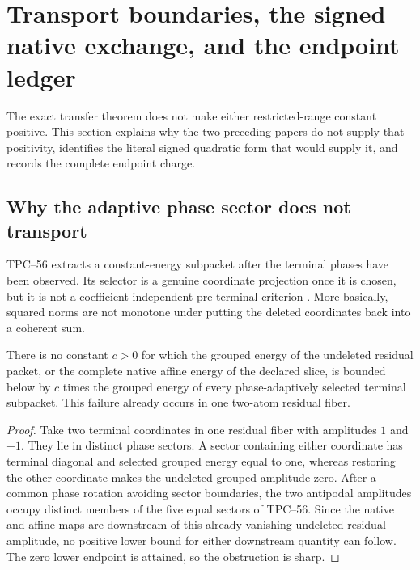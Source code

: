 \section{Transport boundaries, the signed native exchange, and the endpoint ledger}
\label{sec:tpc58-transport-ledger}

The exact transfer theorem does not make either restricted-range constant
positive.  This section explains why the two preceding papers do not supply
that positivity, identifies the literal signed quadratic form that would
supply it, and records the complete endpoint charge.

\subsection{Why the adaptive phase sector does not transport}

TPC--56 extracts a constant-energy subpacket after the terminal phases have
been observed.  Its selector is a genuine coordinate projection once it is
chosen, but it is not a coefficient-independent pre-terminal criterion
\citep{WangTPC56}.  More basically, squared norms are not monotone under
putting the deleted coordinates back into a coherent sum.

\begin{proposition}
\label{prop:tpc58-adaptive-nontransport}
There is no constant \(c>0\) for which the grouped energy of the undeleted
residual packet, or the complete native affine energy of the declared
slice, is bounded below by
\(c\) times the grouped energy of every phase-adaptively selected terminal
subpacket.  This failure already occurs in one two-atom residual fiber.
\end{proposition}

\begin{proof}
Take two terminal coordinates in one residual fiber with amplitudes \(1\)
and \(-1\).  They lie in distinct phase sectors.  A sector containing either
coordinate has terminal diagonal and selected grouped energy equal to one,
whereas restoring the other coordinate makes the undeleted grouped amplitude
zero.  After a common phase rotation avoiding sector boundaries, the two
antipodal amplitudes occupy distinct members of the five equal sectors of
TPC--56.  Since the
native and affine maps are downstream of this already vanishing undeleted
residual amplitude, no positive lower bound for either downstream quantity
can follow.  The zero lower endpoint is attained, so the obstruction is
sharp.
\end{proof}


